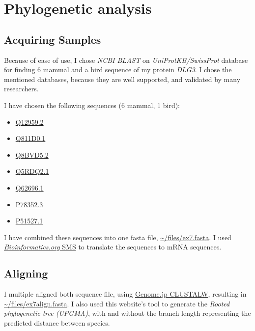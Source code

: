 \chapter{Phylogenetic analysis}
\section{Acquiring Samples}
Because of ease of use, I chose \emph{NCBI BLAST} on \emph{UniProtKB/SwissProt} database for finding 6 mammal and a bird sequence of my protein \emph{DLG3}.
I chose the mentioned databases, because they are well supported, and validated by many researchers.

I have chosen the following sequences (6 mammal, 1 bird):
\begin{itemize}
\item \href{https://blast.ncbi.nlm.nih.gov/Blast.cgi#alnHdr_223590196}{Q12959.2}
\item \href{https://blast.ncbi.nlm.nih.gov/Blast.cgi#alnHdr_59797853}{Q811D0.1}

\item \href{https://blast.ncbi.nlm.nih.gov/Blast.cgi#alnHdr_182667930}{Q8BVD5.2}
\item \href{https://blast.ncbi.nlm.nih.gov/Blast.cgi#alnHdr_67460767}{Q5RDQ2.1}

\item \href{https://blast.ncbi.nlm.nih.gov/Blast.cgi#alnHdr_2497505}{ 	Q62696.1}
\item \href{https://blast.ncbi.nlm.nih.gov/Blast.cgi#alnHdr_71658825}{P78352.3}

\item \href{https://www.ncbi.nlm.nih.gov/protein/1708495?report=genbank&log\$=prottop&blast_rank=2&RID=33MZJTCK014}{P51527.1}
\end{itemize}

I have combined these sequences into one fasta file, \url{~/files/ex7.fasta}.
I used \href{http://www.bioinformatics.org/sms2/rev_trans.html}{\emph{Bioinformatics.org} SMS} to translate the sequences to mRNA sequences.

\section{Aligning}
I multiple aligned both sequence file, using \href{http://www.genome.jp/tools-bin/clustalw}{Genome.jp CLUSTALW}, resulting in \url{~/files/ex7align.fasta}.
I also used this website's tool to generate the \emph{Rooted phylogenetic tree (UPGMA)}, with and without the branch length representing the predicted distance between species.


